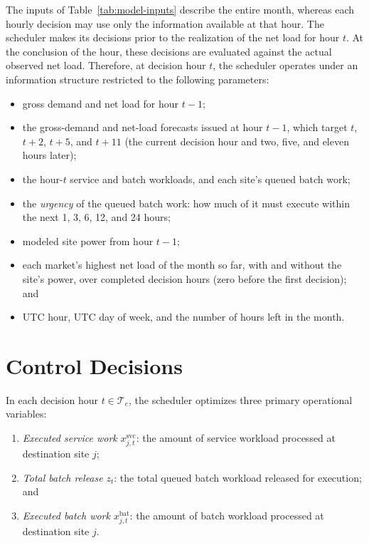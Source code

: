 \documentclass{UNCC-thesis}
\begin{document}
The inputs of Table~\ref{tab:model-inputs} describe the entire month, whereas each hourly
decision may use only the information available at that hour.
The scheduler makes its decisions prior to the realization of the net load for hour \(t\).
At the conclusion of the hour, these decisions are evaluated against the actual observed net load.
Therefore, at decision hour \(t\), the scheduler operates under an information structure
restricted to the following parameters:
\begin{itemize}
  \item gross demand and net load for hour \(t-1\);
  \item the gross-demand and net-load forecasts issued at hour \(t-1\),
        which target \(t\), \(t+2\), \(t+5\), and \(t+11\) (the current
        decision hour and two, five, and eleven hours later);
  \item the hour-\(t\) service and batch workloads, and each site's queued
        batch work;
    \item the \emph{urgency} of the queued batch work: how much of it must execute
        within the next 1, 3, 6, 12, and 24 hours;
  \item modeled site power from hour \(t-1\);
    \item each market's highest net load of the month so far, with and without the site's
        power, over completed decision hours (zero before the first decision); and
  \item UTC hour, UTC day of week, and the number of hours left in the
        month.
\end{itemize}

\section{Control Decisions}
\label{subsec:problem-decisions}

In each decision hour \(t\in\mathcal T_e\), the scheduler optimizes three primary
operational variables:
\begin{enumerate}
  \item \emph{Executed service work} \(x^{\mathrm{svc}}_{j,t}\): the amount of
        service workload processed at destination site \(j\);
  \item \emph{Total batch release} \(z_t\): the total queued batch workload released
        for execution; and
  \item \emph{Executed batch work} \(x^{\mathrm{bat}}_{j,t}\): the amount of batch
        workload processed at destination site \(j\).
\end{enumerate}
\end{document}
